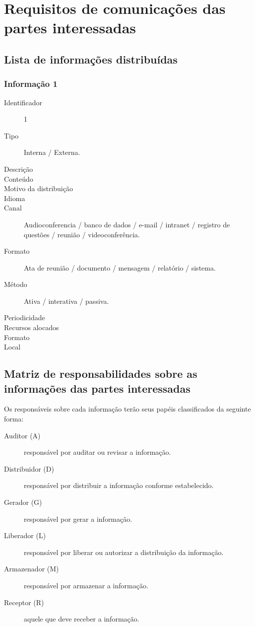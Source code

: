 \iffalse
\chapter{Requisitos de comunicações das partes interessadas}
\label{ch:stakeholder-communication-requirements}

\section{Lista de informações distribuídas}

\subsection{Informação 1}

\begin{description}
\item[Identificador] 1
\item[Tipo] Interna / Externa.
\item[Descrição]
\item[Conteúdo]
\item[Motivo da distribuição]
\item[Idioma]
\item[Canal] Audioconferencia / banco de dados / e-mail / intranet / registro de questões / reunião / videoconferência.
\item[Formato] Ata de reunião / documento / mensagem / relatório / sistema.
\item[Método] Ativa / interativa / passiva.
\item[Periodicidade] 
\item[Recursos alocados]
\item[Formato]
\item[Local]
\end{description}

\section{Matriz de responsabilidades sobre as informações das partes interessadas}

Os responsáveis sobre cada informação terão seus papéis classificados da seguinte forma:

\begin{description}
\item[Auditor (A)] responsável por auditar ou revisar a informação.
\item[Distribuidor (D)] responsável por distribuir a informação conforme estabelecido.
\item[Gerador (G)] responsável por gerar a informação.
\item[Liberador (L)] responsável por liberar ou autorizar a distribuição da informação.
\item[Armazenador (M)] responsável por armazenar a informação.
\item[Receptor (R)] aquele que deve receber a informação.
\end{description}

